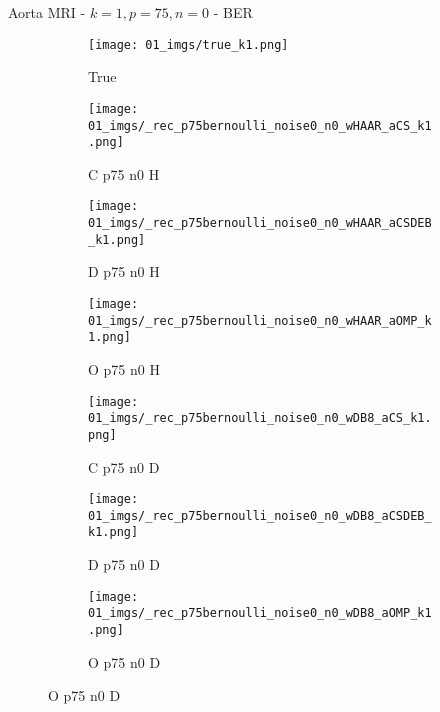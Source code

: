 \begin{frame}{Aorta MRI - $k=1,p=75,n=0$ - BER}{}
\begin{figure}
\begin{subfigure}{0.13\textwidth}
\texttt{[image: 01\_imgs/true\_k1.png]}
\caption*{\tiny True}
\end{subfigure}
\begin{subfigure}{0.13\textwidth}
\texttt{[image: 01\_imgs/\_rec\_p75bernoulli\_noise0\_n0\_wHAAR\_aCS\_k1.png]}
\caption*{\tiny C p75 n0 H}
\end{subfigure}
\begin{subfigure}{0.13\textwidth}
\texttt{[image: 01\_imgs/\_rec\_p75bernoulli\_noise0\_n0\_wHAAR\_aCSDEB\_k1.png]}
\caption*{\tiny D p75 n0 H}
\end{subfigure}
\begin{subfigure}{0.13\textwidth}
\texttt{[image: 01\_imgs/\_rec\_p75bernoulli\_noise0\_n0\_wHAAR\_aOMP\_k1.png]}
\caption*{\tiny O p75 n0 H}
\end{subfigure}
\begin{subfigure}{0.13\textwidth}
\texttt{[image: 01\_imgs/\_rec\_p75bernoulli\_noise0\_n0\_wDB8\_aCS\_k1.png]}
\caption*{\tiny C p75 n0 D}
\end{subfigure}
\begin{subfigure}{0.13\textwidth}
\texttt{[image: 01\_imgs/\_rec\_p75bernoulli\_noise0\_n0\_wDB8\_aCSDEB\_k1.png]}
\caption*{\tiny D p75 n0 D}
\end{subfigure}
\begin{subfigure}{0.13\textwidth}
\texttt{[image: 01\_imgs/\_rec\_p75bernoulli\_noise0\_n0\_wDB8\_aOMP\_k1.png]}
\caption*{\tiny O p75 n0 D}
\end{subfigure}

\vspace{5pt}


\end{figure}
\end{frame}
